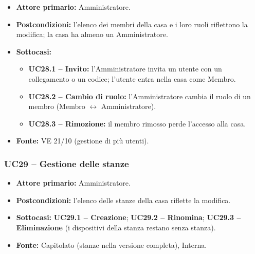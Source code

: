 \documentclass[12pt,a4paper]{article}
\newcommand{\tightlist}{\setlength{\itemsep}{1pt}\setlength{\parskip}{0pt}}
\begin{document}
\begin{itemize}

\tightlist

\item \textbf{Attore primario:} Amministratore.

\item \textbf{Postcondizioni:} l'elenco dei membri della casa e i loro ruoli riflettono la modifica; la casa ha almeno un Amministratore.

\item \textbf{Sottocasi:}

\begin{itemize}

\tightlist

\item \textbf{UC28.1 -- Invito:} l'Amministratore invita un utente con un collegamento o un codice; l'utente entra nella casa come Membro.

\item \textbf{UC28.2 -- Cambio di ruolo:} l'Amministratore cambia il ruolo di un membro (Membro $\leftrightarrow$ Amministratore).

\item \textbf{UC28.3 -- Rimozione:} il membro rimosso perde l'accesso alla casa.

\end{itemize}

\item \textbf{Fonte:} VE 21/10 (gestione di più utenti).

\end{itemize}



\subsubsection{UC29 -- Gestione delle stanze}

\begin{itemize}

\tightlist

\item \textbf{Attore primario:} Amministratore.

\item \textbf{Postcondizioni:} l'elenco delle stanze della casa riflette la modifica.

\item \textbf{Sottocasi:} \textbf{UC29.1 -- Creazione}; \textbf{UC29.2 -- Rinomina}; \textbf{UC29.3 -- Eliminazione} (i dispositivi della stanza restano senza stanza).

\item \textbf{Fonte:} Capitolato (stanze nella versione completa), Interna.

\end{itemize}
\end{document}
